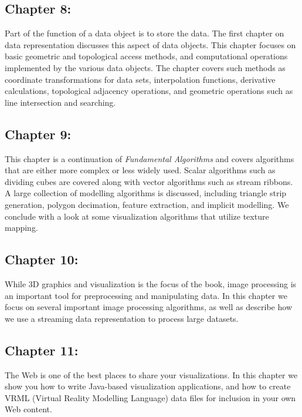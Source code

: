 \subsection*{Chapter 8: }

Part of the function of a data object is to store the data. The first chapter on data representation discusses this aspect of data objects. This chapter focuses on basic geometric and topological access methods, and computational operations implemented by the various data objects. The chapter covers such methods as coordinate transformations for data sets, interpolation functions, derivative calculations, topological adjacency operations, and geometric operations such as line intersection and searching.

\subsection*{Chapter 9: }

This chapter is a continuation of \emph{Fundamental Algorithms} and covers algorithms that are either more complex or less widely used. Scalar algorithms such as dividing cubes are covered along with vector algorithms such as stream ribbons. A large collection of modelling algorithms is discussed, including triangle strip generation, polygon decimation, feature extraction, and implicit modelling. We conclude with a look at some visualization algorithms that utilize texture mapping.

\subsection*{Chapter 10: }

While 3D graphics and visualization is the focus of the book, image processing is an important tool for preprocessing and manipulating data. In this chapter we focus on several important image processing algorithms, as well as describe how we use a streaming data representation to process large datasets. 

\subsection*{Chapter 11: }

The Web is one of the best places to share your visualizations. In this chapter we show you how to write Java-based visualization applications, and how to create VRML (Virtual Reality Modelling Language) data files for inclusion in your own Web content.

